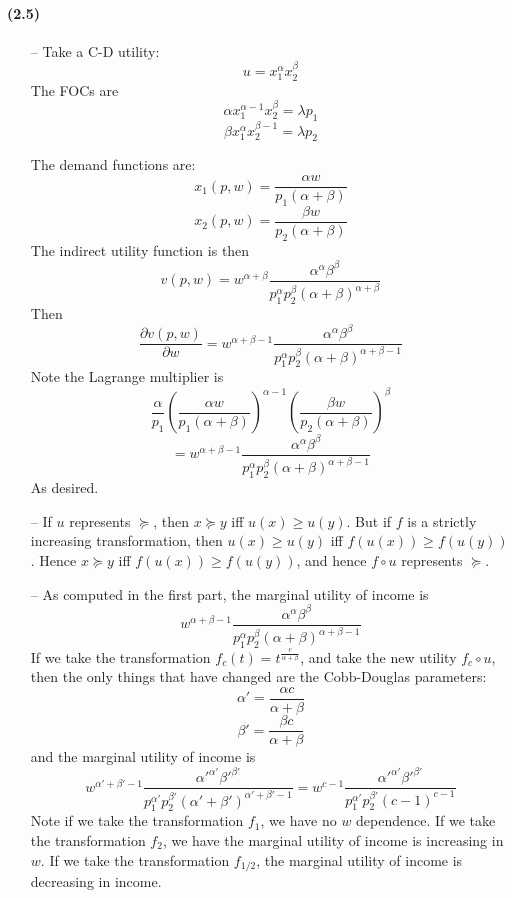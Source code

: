 \documentclass[10pt,letter]{article}
\begin{document}
\paragraph{(2.5)}
\begin{itemize}
\item[--] Take a C-D utility:
\[ u = x_1^\alpha x_2^{\beta} \]
The FOCs are
\[ \alpha x_1^{\alpha-1} x_2^{\beta} = \lambda p_1 \]
\[ \beta x_1^{\alpha} x_2^{\beta - 1} = \lambda p_2 \]

The demand functions are:
\[ x_1(p,w) = \frac{\alpha w}{p_1(\alpha + \beta)} \]
\[ x_2(p,w) = \frac{\beta w}{p_2(\alpha + \beta)} \]
The indirect utility function is then
\[ v(p,w) = w^{\alpha + \beta}\frac{\alpha^\alpha\beta^\beta }{p_1^\alpha p_2^{\beta} (\alpha + \beta)^{\alpha + \beta}}\]
Then
\[ \frac{\partial v(p,w)}{\partial w} = w^{\alpha + \beta - 1}\frac{\alpha^\alpha\beta^\beta }{p_1^\alpha p_2^{\beta}(\alpha + \beta)^{\alpha + \beta - 1}} \]
Note the Lagrange multiplier is
\[\frac{\alpha}{p_1} \left(\frac{\alpha w}{p_1(\alpha + \beta)}\right)^{\alpha-1}\left( \frac{\beta w}{p_2(\alpha + \beta)} \right)^{\beta}  \]
\[ = w^{\alpha + \beta - 1}\frac{\alpha^\alpha\beta^\beta }{p_1^\alpha p_2^{\beta} (\alpha + \beta)^{\alpha + \beta - 1}}  \]
As desired.
\item[--]
If $u$ represents $\succeq$, then $x \succeq y$ iff $u(x) \ge u(y)$. But if $f$ is a strictly increasing transformation, then $u(x) \ge u(y)$ iff $f(u(x)) \ge f(u(y))$. Hence $x \succeq y$ iff $f(u(x)) \ge f(u(y))$, and hence $f \circ u$ represents $\succeq$.
\item[--]
As computed in the first part, the marginal utility of income is
\[ w^{\alpha + \beta - 1}\frac{\alpha^\alpha\beta^\beta }{p_1^\alpha p_2^{\beta} (\alpha + \beta)^{\alpha + \beta - 1}} \]
If we take the transformation $f_c(t) = t^{\frac{c}{\alpha + \beta}}$, and take the new utility $f_c \circ u$, then the only things that have changed are the Cobb-Douglas parameters:
\[ \alpha' = \frac{\alpha c}{\alpha + \beta} \]
\[ \beta' = \frac{\beta c}{\alpha + \beta} \]
and the marginal utility of income is
\[ w^{\alpha' + \beta' - 1}\frac{\alpha'^{\alpha'}\beta'^{\beta'} }{p_1^{\alpha'} p_2^{\beta'} (\alpha' + \beta')^{\alpha' + \beta' - 1}}  = w^{c-1} \frac{\alpha'^{\alpha'}\beta'^{\beta'} }{p_1^{\alpha'} p_2^{\beta'} (c-1)^{c-1}}\]
Note if we take the transformation $f_1$, we have no $w$ dependence. If we take the transformation $f_2$, we have the marginal utility of income is increasing in $w$. If we take the transformation $f_{1/2}$, the marginal utility of income is decreasing in income.

\end{itemize}
\end{document}
